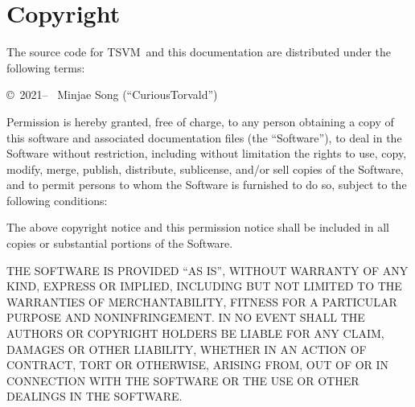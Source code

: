 \documentclass[10pt, stock, openany, chapter]{memoir}
\newcommand{\thismachine}{TSVM}
\begin{document}
\chapter*{Copyright}

The source code for \thismachine\ and this documentation are distributed under the following terms:

\copyright\ 2021-- \ Minjae Song (``CuriousTorvald'')

Permission is hereby granted, free of charge, to any person obtaining a copy
of this software and associated documentation files (the ``Software''), to deal
in the Software without restriction, including without limitation the rights
to use, copy, modify, merge, publish, distribute, sublicense, and/or sell
copies of the Software, and to permit persons to whom the Software is
furnished to do so, subject to the following conditions:

The above copyright notice and this permission notice shall be included in all
copies or substantial portions of the Software.

THE SOFTWARE IS PROVIDED ``AS IS'', WITHOUT WARRANTY OF ANY KIND, EXPRESS OR
IMPLIED, INCLUDING BUT NOT LIMITED TO THE WARRANTIES OF MERCHANTABILITY,
FITNESS FOR A PARTICULAR PURPOSE AND NONINFRINGEMENT. IN NO EVENT SHALL THE
AUTHORS OR COPYRIGHT HOLDERS BE LIABLE FOR ANY CLAIM, DAMAGES OR OTHER
LIABILITY, WHETHER IN AN ACTION OF CONTRACT, TORT OR OTHERWISE, ARISING FROM,
OUT OF OR IN CONNECTION WITH THE SOFTWARE OR THE USE OR OTHER DEALINGS IN THE
SOFTWARE.

\printindex

\afterpage{\pagestyle{empty}\null\newpage}
\end{document}
